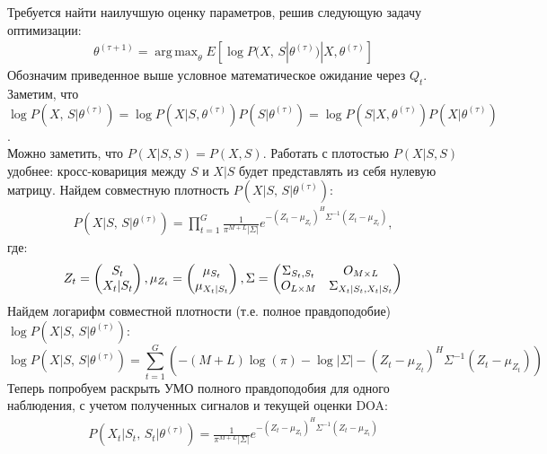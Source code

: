 \documentclass[11pt]{article}
\DeclareMathOperator*{\argmax}{arg\,max}
\begin{document}
\begin{center}
\fontsize{16}{20}\selectfont {}
\end{center}
Требуется найти наилучшую оценку параметров, решив следующую задачу оптимизации:
\begin{gather}
\theta^{(\tau+1)}=\argmax_{\theta} E[\log P(X, \, S|\theta^{(\tau)})|X, \theta^{(\tau)}]
\end{gather}
Обозначим приведенное выше условное математическое ожидание через $Q_t$. 
Заметим, что \\ $\log P(X, \, S|\theta^{(\tau)}) = \log P(X|S,\theta^{(\tau)})P(S|\theta^{(\tau)}) = \log P(S|X,\theta^{(\tau)})P(X|\theta^{(\tau)})$.\\
Можно заметить, что $P(X|S, S) = P(X, S)$. Работать с плотостью $P(X|S, S)$ удобнее: кросс-ковариция между $S$ и $X|S$ будет представлять из себя нулевую матрицу.
Найдем совместную плотность $P(X|S, \, S|\theta^{(\tau)})$:
\begin{gather}
P(X|S, \, S|\theta^{(\tau)}) = \prod_{t=1}^G \frac{1}{\pi^{M+L}|\Sigma|}e^{-(Z_t-\mu_{Z_t})^H\Sigma^{-1}(Z_t-\mu_{Z_t})},
\end{gather}
где:
\begin{equation*}
Z_t = \begin{pmatrix}
S_t\\
X_t|S_t
\end{pmatrix},
\mu_{Z_t} = \begin{pmatrix}
\mu_{S_t}\\
\mu_{X_t|S_t}
\end{pmatrix}\\,
\Sigma = 
\begin{pmatrix}
\Sigma_{S_t,S_t}&O_{M\times L}\\
O_{L\times M}&\Sigma_{X_t|S_t,X_t|S_t}
\end{pmatrix}
\end{equation*}
Найдем логарифм совместной плотности (т.е. полное правдоподобие) $\log P(X|S, \, S|\theta^{(\tau)})$:
\begin{equation*}
\log P(X|S, \, S|\theta^{(\tau)}) = \sum_{t=1}^G \left(-(M+L)\log(\pi)-\log|\Sigma|-(Z_t-\mu_{Z_t})^H\Sigma^{-1}(Z_t-\mu_{Z_t})\right)
\end{equation*}
Теперь попробуем раскрыть УМО полного правдоподобия для одного наблюдения, с учетом полученных сигналов и текущей оценки DOA:
\begin{gather}
P(X_t|S_t, \, S_t|\theta^{(\tau)}) = \frac{1}{\pi^{M+L}|\Sigma|}e^{-(Z_t-\mu_{Z_t})^H\Sigma^{-1}(Z_t-\mu_{Z_t})}
\end{gather}
\end{document}
